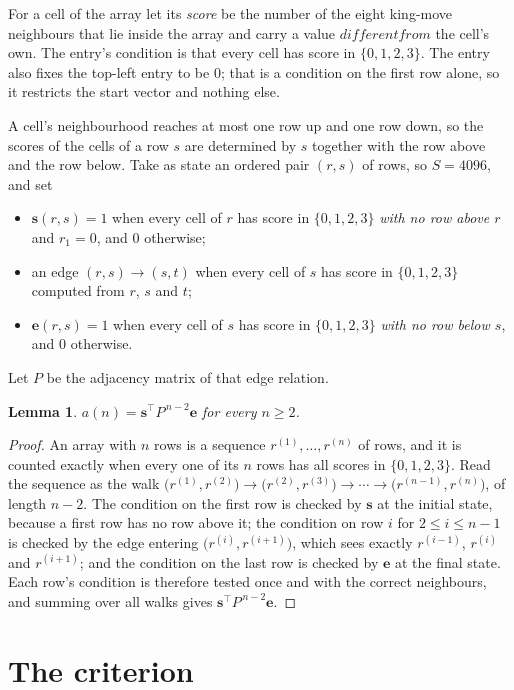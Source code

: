 \documentclass[11pt,a4paper]{article}
\theoremstyle{plain}
\newtheorem{lemma}[theorem]{Lemma}
\theoremstyle{definition}
\begin{document}
For a cell of the array let its \emph{score} be the number of the eight king-move neighbours that lie inside
the array and carry a value $different from$ the cell's own. The entry's condition is that every cell
has score in $\{0,1,2,3\}$. The entry also fixes the top-left entry to be $0$; that is a condition on the first row alone, so it restricts the start vector and nothing else.

A cell's neighbourhood reaches at most one row up and one row down, so the scores of the
cells of a row $s$ are determined by $s$ together with the row above and the row below.
Take as state an ordered pair $(r,s)$ of rows, so $S=4096$, and set
\begin{itemize}
\item $\mathbf{s}(r,s)=1$ when every cell of $r$ has score in $\{0,1,2,3\}$ \emph{with no row
above $r$} and $r_1=0$, and $0$ otherwise;
\item an edge $(r,s)\to(s,t)$ when every cell of $s$ has score in $\{0,1,2,3\}$ computed from
$r$, $s$ and $t$;
\item $\mathbf{e}(r,s)=1$ when every cell of $s$ has score in $\{0,1,2,3\}$ \emph{with no row
below $s$}, and $0$ otherwise.
\end{itemize}
Let $P$ be the adjacency matrix of that edge relation.

\begin{lemma}\label{lem:walk}
$a(n)=\mathbf{s}^{\!\top}P^{\,n-2}\mathbf{e}$ for every $n\ge2$.
\end{lemma}

\begin{proof}
An array with $n$ rows is a sequence $r^{(1)},\dots,r^{(n)}$ of rows, and it is counted
exactly when every one of its $n$ rows has all scores in $\{0,1,2,3\}$. Read the sequence as the
walk $\bigl(r^{(1)},r^{(2)}\bigr)\to\bigl(r^{(2)},r^{(3)}\bigr)\to\cdots\to
\bigl(r^{(n-1)},r^{(n)}\bigr)$, of length $n-2$. The condition on the first row is
checked by $\mathbf{s}$ at the initial state, because a first row has no row above it; the
condition on row $i$ for $2\le i\le n-1$ is checked by the edge entering
$\bigl(r^{(i)},r^{(i+1)}\bigr)$, which sees exactly $r^{(i-1)}$, $r^{(i)}$ and
$r^{(i+1)}$; and the condition on the last row is checked by $\mathbf{e}$ at the final
state. Each row's condition is therefore tested once and with the correct neighbours, and
summing over all walks gives $\mathbf{s}^{\!\top}P^{\,n-2}\mathbf{e}$.
\end{proof}

\section{The criterion}
\end{document}
